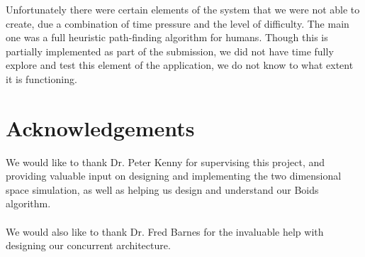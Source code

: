 \documentclass[10pt, a4paper, conference, compsocconf]{IEEEtran}
\begin{document}
Unfortunately there were certain elements of the system that we were not able to create, due a combination of time pressure and the level of difficulty. The main one was a full heuristic path-finding algorithm for humans. Though this is partially implemented as part of the submission, we did not have time fully explore and test this element of the application, we do not know to what extent it is functioning.

\section{Acknowledgements}
We would like to thank Dr. Peter Kenny for supervising this project, and providing valuable input on designing and implementing the two dimensional space simulation, as well as helping us design and understand our Boids algorithm.\\
\\
We would also like to thank Dr. Fred Barnes for the invaluable help with designing our concurrent architecture.

\end{document}
